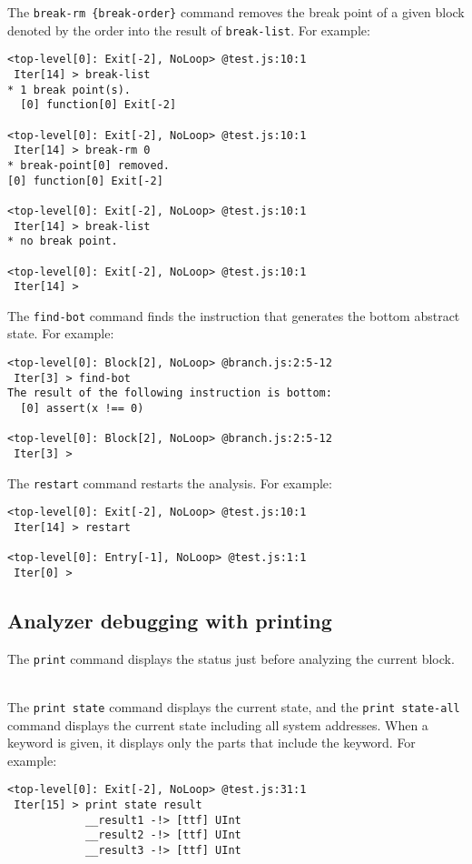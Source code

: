 \medskip
The \verb!break-rm {break-order}! command
removes the break point of a given block
denoted by the order into the result of \verb!break-list!.
For example:
{\small
\begin{verbatim}
<top-level[0]: Exit[-2], NoLoop> @test.js:10:1
 Iter[14] > break-list
* 1 break point(s).
  [0] function[0] Exit[-2]

<top-level[0]: Exit[-2], NoLoop> @test.js:10:1
 Iter[14] > break-rm 0
* break-point[0] removed.
[0] function[0] Exit[-2]

<top-level[0]: Exit[-2], NoLoop> @test.js:10:1
 Iter[14] > break-list
* no break point.

<top-level[0]: Exit[-2], NoLoop> @test.js:10:1
 Iter[14] >
\end{verbatim}
}

\medskip
The \verb!find-bot! command finds the instruction
that generates the bottom abstract state.  For example:
{\small
\begin{verbatim}
<top-level[0]: Block[2], NoLoop> @branch.js:2:5-12
 Iter[3] > find-bot
The result of the following instruction is bottom:
  [0] assert(x !== 0)

<top-level[0]: Block[2], NoLoop> @branch.js:2:5-12
 Iter[3] >
\end{verbatim}
}

\medskip
The \verb!restart! command restarts the analysis.  For example:
{\small
\begin{verbatim}
<top-level[0]: Exit[-2], NoLoop> @test.js:10:1
 Iter[14] > restart

<top-level[0]: Entry[-1], NoLoop> @test.js:1:1
 Iter[0] >
\end{verbatim}
}

\subsection{Analyzer debugging with printing}
\label{s:3:2:1:refman}
The \verb!print! command displays the status just before
analyzing the current block.

\medskip\noindent
{}\\[.2em]
The \verb!print state! command displays the current state,
and the \verb!print state-all! command
displays the current state including all system addresses.
When a keyword is given, it displays only the parts that include the keyword.
For example:
{\small
\begin{verbatim}
<top-level[0]: Exit[-2], NoLoop> @test.js:31:1
 Iter[15] > print state result
            __result1 -!> [ttf] UInt
            __result2 -!> [ttf] UInt
            __result3 -!> [ttf] UInt
\end{verbatim}
}


